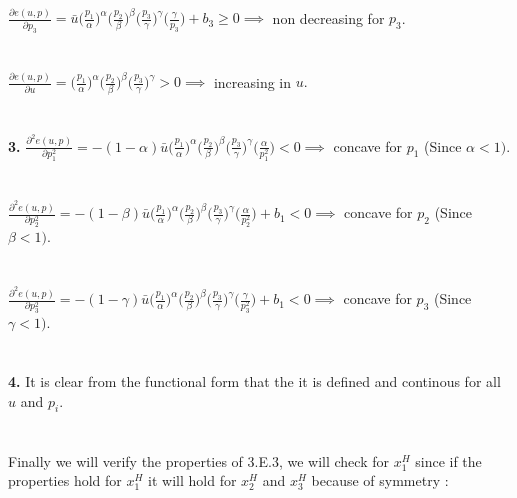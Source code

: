 \documentclass[12pt]{article}
\newenvironment{problem}[2][Problem]{\begin{trivlist}
\item[\hskip \labelsep {\bfseries #1}\hskip \labelsep {\bfseries #2.}]}{\end{trivlist}}
\newcommand\ddfrac[2]{\frac{\displaystyle #1}{\displaystyle #2}}
\begin{document}
\begin{problem}{5}
\\
\\
\\
$\ddfrac{\partial e(u, p)}{\partial p_3} = \bar{u} \bigg(\ddfrac{p_1 }{ \alpha} \bigg)^{\alpha} \bigg(\ddfrac{ p_2}{\beta } \bigg)^\beta   \bigg(\ddfrac{p_3}{  \gamma } \bigg)^{\gamma} \bigg(\ddfrac{ \gamma}{ p_3 } \bigg) + b_3  \geq 0 \implies $ non decreasing for $p_3$. 
\\
\\
\\
$\ddfrac{\partial e(u, p)}{\partial u} =  \bigg(\ddfrac{p_1 }{ \alpha} \bigg)^{\alpha} \bigg(\ddfrac{ p_2}{\beta } \bigg)^\beta   \bigg(\ddfrac{p_3}{  \gamma } \bigg)^{\gamma} > 0 \implies $ increasing in $ u. $
\\
\\
\\
\textbf{3.} $\ddfrac{\partial^2 e(u, p)}{\partial p_1^2} = - (1- \alpha) \bar{u} \bigg(\ddfrac{p_1 }{ \alpha} \bigg)^{\alpha} \bigg(\ddfrac{ p_2}{\beta } \bigg)^\beta   \bigg(\ddfrac{p_3}{  \gamma } \bigg)^{\gamma} \bigg(\ddfrac{ \alpha}{ p_1^2 } \bigg)   < 0 \implies $ concave for $p_1$ (Since $ \alpha < 1)$. 
\\
\\
\\
$\ddfrac{\partial^2 e(u, p)}{\partial p_2^2} = - (1- \beta) \bar{u} \bigg(\ddfrac{p_1 }{ \alpha} \bigg)^{\alpha} \bigg(\ddfrac{ p_2}{\beta } \bigg)^\beta   \bigg(\ddfrac{p_3}{  \gamma } \bigg)^{\gamma} \bigg(\ddfrac{ \alpha}{ p_2^2 } \bigg) + b_1  < 0 \implies $ concave for $p_2$ (Since $ \beta < 1)$. 
\\
\\
\\
$\ddfrac{\partial^2 e(u, p)}{\partial p_3^2} = - (1- \gamma) \bar{u} \bigg(\ddfrac{p_1 }{ \alpha} \bigg)^{\alpha} \bigg(\ddfrac{ p_2}{\beta } \bigg)^\beta   \bigg(\ddfrac{p_3}{  \gamma } \bigg)^{\gamma} \bigg(\ddfrac{ \gamma}{ p_3^2 } \bigg) + b_1  < 0 \implies $ concave for $p_3$ (Since $ \gamma < 1)$. 
\\
\\
\\
\textbf{4.} It is clear from the functional form that the it is defined and continous for all $u$ and $ p_i$. 
\\
\\
\\
Finally we will verify the properties of 3.E.3, we will check for $x_1^H $ since if the properties hold for $x_1^H $ it will hold for $x_2^H $ and $x_3^H $ because of symmetry :

\end{problem}
\end{document}
